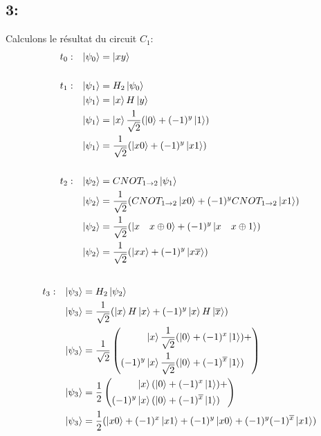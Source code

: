 \documentclass{article}
\begin{document}
\subsection*{3:}
Calculons le résultat du circuit $C_1$:
\begin{align*}
&t_0:&  \ket{\psi_0} &= \ket{xy} \\ \\
&t_1:&  \ket{\psi_1} &= H_2\ket{\psi_0} \\
&&      \ket{\psi_1} &= \ket{x}H\ket{y} \\
&&      \ket{\psi_1} &= \ket{x}\frac{1}{\sqrt{2}}(\ket{0} + (-1)^y \ket{1}) \\
&&      \ket{\psi_1} &= \frac{1}{\sqrt{2}}(\ket{x0} + (-1)^y \ket{x1}) \\ \\
&t_2:&  \ket{\psi_2} &= CNOT_{1 \rightarrow 2}\ket{\psi_1} \\
&&      \ket{\psi_2} &= \frac{1}{\sqrt{2}}(CNOT_{1 \rightarrow 2}\ket{x0} + (-1)^yCNOT_{1 \rightarrow 2}\ket{x1}) \\
&&      \ket{\psi_2} &= \frac{1}{\sqrt{2}}(\ket{x \quad x \oplus 0} + (-1)^y\ket{x \quad x \oplus 1}) \\
&&      \ket{\psi_2} &= \frac{1}{\sqrt{2}}(\ket{xx} + (-1)^y\ket{x \overline{x}}) \\ \\
\end{align*}
\begin{align*}
&t_3:&  \ket{\psi_3} &= H_2\ket{\psi_2} \\
&&      \ket{\psi_3} &= \frac{1}{\sqrt{2}}(\ket{x}H\ket{x} + (-1)^y \ket{x}H\ket{\overline{x}}) \\
&&      \ket{\psi_3} &= \frac{1}{\sqrt{2}}\left(
        \begin{aligned}
                &\ket{x}\frac{1}{\sqrt{2}}(\ket{0} + (-1)^x \ket{1}) + \\
        (-1)^y  &\ket{x}\frac{1}{\sqrt{2}}(\ket{0} + (-1)^{\overline{x}} \ket{1}) \\
        \end{aligned}
    \right) \\
&&      \ket{\psi_3} &= \frac{1}{2}\left(
        \begin{aligned}
                &\ket{x}(\ket{0} + (-1)^x \ket{1}) + \\
        (-1)^y  &\ket{x}(\ket{0} + (-1)^{\overline{x}} \ket{1}) \\
        \end{aligned}
    \right) \\
&&      \ket{\psi_3} &= \frac{1}{2}(\ket{x0} + (-1)^x\ket{x1} + (-1)^y\ket{x0} + (-1)^y(-1)^{\overline{x}} \ket{x1}) \\
\end{align*}
\end{document}
